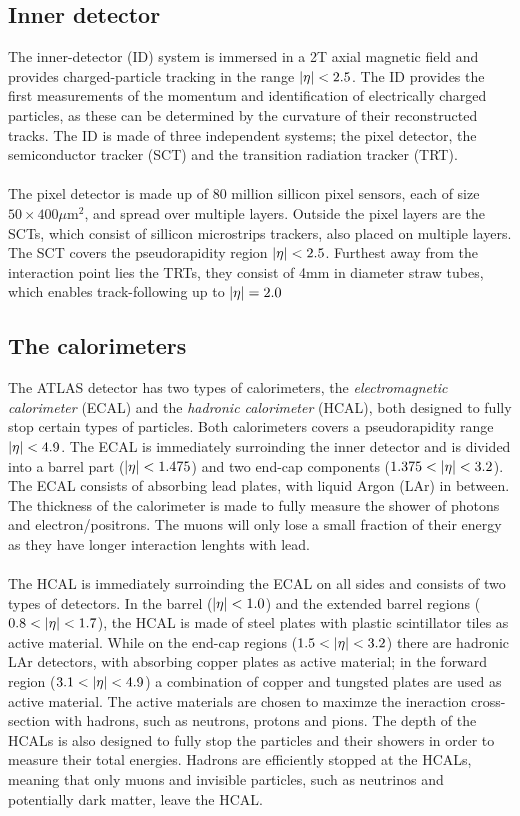 \documentclass[12pt, a4paper]{book}
\begin{document}
\subsection{Inner detector}\label{sec:ID} 
The inner-detector (ID) system is immersed in a 2T axial magnetic field and provides charged-particle tracking in the range $\abs{\eta}<2.5$. The ID provides the first measurements of the 
momentum and identification of electrically charged particles, as these can be determined by the curvature of their reconstructed tracks. 
The ID is made of three independent systems; the pixel detector, the semiconductor tracker (SCT) and 
the transition radiation tracker (TRT). \\
\\The pixel detector is made up of 80 million sillicon pixel sensors, each of size $50\times400\mu$m$^2$, %
and spread over multiple layers. Outside the pixel layers 
are the SCTs, which consist of sillicon microstrips trackers, also placed on multiple layers. The SCT covers the pseudorapidity region $\abs{\eta}<2.5$. Furthest away from the interaction point lies the TRTs, 
they consist of 4mm in diameter straw tubes, which enables track-following up to $\abs{\eta}=2.0$ 

\subsection{The calorimeters}\label{sec:calories}
The ATLAS detector has two types of calorimeters, the \textit{electromagnetic calorimeter} (ECAL) and the \textit{hadronic calorimeter} (HCAL), both designed to fully stop certain types of particles. 
Both calorimeters covers a pseudorapidity range $\abs{\eta}<4.9$. The ECAL is immediately surroinding the inner detector and is divided into a barrel part ($\abs{\eta}<1.475$) and two end-cap components ($1.375<\abs{\eta}<3.2$). 
The ECAL consists of absorbing lead plates, with liquid Argon (LAr) in between. The thickness of the calorimeter is made to fully measure the shower of photons and electron/positrons. The muons will only lose 
a small fraction of their energy as they have longer interaction lenghts with lead.\\
\\The HCAL is immediately surroinding the ECAL on all sides and consists of two types of detectors. In the barrel ($\abs{\eta}<1.0$) and the extended barrel regions ($0.8<\abs{\eta}<1.7$), the HCAL is made of 
steel plates with plastic scintillator tiles as active material. While on the end-cap regions ($1.5<\abs{\eta}<3.2$) there are hadronic LAr detectors, with absorbing copper plates as active material; in the 
forward region ($3.1<\abs{\eta}<4.9$) a combination of copper and tungsted plates are used as active material. The active materials are chosen to maximze the ineraction cross-section with hadrons, such as neutrons, 
protons and pions. The depth of the HCALs is also designed to fully stop the particles and their showers in order to measure their total energies. Hadrons are efficiently stopped at the HCALs, meaning that only 
muons and invisible particles, such as neutrinos and potentially dark matter, leave the HCAL.
\end{document}
